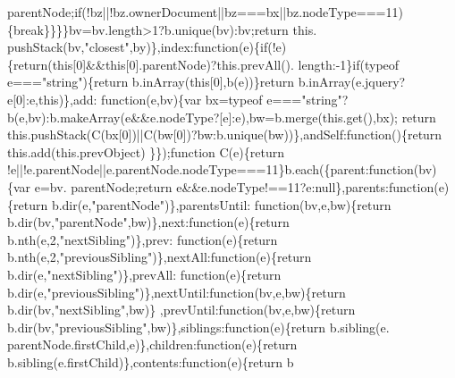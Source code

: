\begin{DoxyCode}
      parentNode;\textcolor{keywordflow}{if}(!bz||!bz.ownerDocument||bz===bx||bz.nodeType===11)\{\textcolor{keywordflow}{break}\}\}\}\}bv=bv.length>1?b.unique(bv):bv;\textcolor{keywordflow}{return} this.
      pushStack(bv,\textcolor{stringliteral}{"closest"},by)\},index:\textcolor{keyword}{function}(e)\{\textcolor{keywordflow}{if}(!e)\{\textcolor{keywordflow}{return}(\textcolor{keyword}{this}[0]&&\textcolor{keyword}{this}[0].parentNode)?this.prevAll().
      length:-1\}\textcolor{keywordflow}{if}(typeof e===\textcolor{stringliteral}{"string"})\{\textcolor{keywordflow}{return} b.inArray(\textcolor{keyword}{this}[0],b(e))\}\textcolor{keywordflow}{return} b.inArray(e.jquery?e[0]:e,\textcolor{keyword}{this})\},add:\textcolor{keyword}{
      function}(e,bv)\{var bx=typeof e===\textcolor{stringliteral}{"string"}?b(e,bv):b.makeArray(e&&e.nodeType?[e]:e),bw=b.merge(this.get(),bx);\textcolor{keywordflow}{
      return} this.pushStack(C(bx[0])||C(bw[0])?bw:b.unique(bw))\},andSelf:\textcolor{keyword}{function}()\{\textcolor{keywordflow}{return} this.add(this.prevObject)
      \}\});\textcolor{keyword}{function} C(e)\{\textcolor{keywordflow}{return} !e||!e.parentNode||e.parentNode.nodeType===11\}b.each(\{parent:\textcolor{keyword}{function}(bv)\{var e=bv.
      parentNode;\textcolor{keywordflow}{return} e&&e.nodeType!==11?e:null\},parents:\textcolor{keyword}{function}(e)\{\textcolor{keywordflow}{return} b.dir(e,\textcolor{stringliteral}{"parentNode"})\},parentsUntil:\textcolor{keyword}{
      function}(bv,e,bw)\{\textcolor{keywordflow}{return} b.dir(bv,\textcolor{stringliteral}{"parentNode"},bw)\},next:\textcolor{keyword}{function}(e)\{\textcolor{keywordflow}{return} b.nth(e,2,\textcolor{stringliteral}{"nextSibling"})\},prev:\textcolor{keyword}{
      function}(e)\{\textcolor{keywordflow}{return} b.nth(e,2,\textcolor{stringliteral}{"previousSibling"})\},nextAll:\textcolor{keyword}{function}(e)\{\textcolor{keywordflow}{return} b.dir(e,\textcolor{stringliteral}{"nextSibling"})\},prevAll:\textcolor{keyword}{
      function}(e)\{\textcolor{keywordflow}{return} b.dir(e,\textcolor{stringliteral}{"previousSibling"})\},nextUntil:\textcolor{keyword}{function}(bv,e,bw)\{\textcolor{keywordflow}{return} b.dir(bv,\textcolor{stringliteral}{"nextSibling"},bw)\}
      ,prevUntil:\textcolor{keyword}{function}(bv,e,bw)\{\textcolor{keywordflow}{return} b.dir(bv,\textcolor{stringliteral}{"previousSibling"},bw)\},siblings:\textcolor{keyword}{function}(e)\{\textcolor{keywordflow}{return} b.sibling(e.
      parentNode.firstChild,e)\},children:\textcolor{keyword}{function}(e)\{\textcolor{keywordflow}{return} b.sibling(e.firstChild)\},contents:\textcolor{keyword}{function}(e)\{\textcolor{keywordflow}{return} b

\end{DoxyCode}
